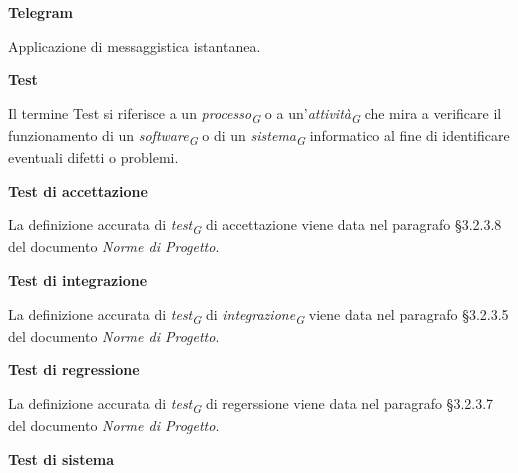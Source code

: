 \documentclass{article}
\begin{document}
\vspace{0.4cm}

\textbf{Telegram}

\vspace{0.1cm}

Applicazione di messaggistica istantanea.

\vspace{0.4cm}

\textbf{Test}

\vspace{0.1cm}

Il termine Test si riferisce a un \textit{processo}\textsubscript{\textit{G}} o a un'\textit{attività}\textsubscript{\textit{G}} che mira a verificare il funzionamento di un \textit{software}\textsubscript{\textit{G}} o di un \textit{sistema}\textsubscript{\textit{G}} informatico al fine di identificare eventuali difetti o problemi.

\vspace{0.4cm}

\textbf{Test di accettazione}

\vspace{0.1cm}

La definizione accurata di \textit{test}\textsubscript{\textit{G}} di accettazione viene data nel paragrafo §3.2.3.8 del documento \textit{Norme di Progetto}.

\vspace{0.4cm}

\textbf{Test di integrazione}

\vspace{0.1cm}

La definizione accurata di \textit{test}\textsubscript{\textit{G}} di \textit{integrazione}\textsubscript{\textit{G}} viene data nel paragrafo §3.2.3.5 del documento \textit{Norme di Progetto}.

\vspace{0.4cm}

\textbf{Test di regressione}

\vspace{0.1cm}

La definizione accurata di \textit{test}\textsubscript{\textit{G}} di regerssione viene data nel paragrafo §3.2.3.7 del documento \textit{Norme di Progetto}.

\vspace{0.4cm}

\textbf{Test di sistema} 

\vspace{0.1cm}
\end{document}
